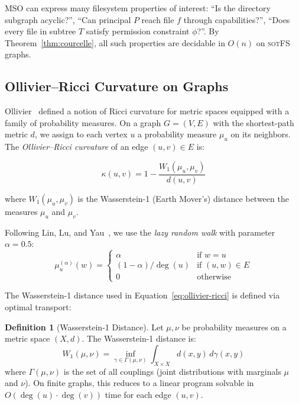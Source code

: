 \documentclass[11pt,a4paper]{article}
\theoremstyle{definition}
\newtheorem{definition}{Definition}[section]
\theoremstyle{remark}
\newcommand{\sotfs}{\textsc{sotFS}}
\newcommand{\OR}{\ensuremath{\kappa}}  %
\newcommand{\Wone}{\ensuremath{W_1}}
\begin{document}
MSO can express many filesystem properties of interest: ``Is the
directory subgraph acyclic?'', ``Can principal $P$ reach file $f$
through capabilities?'', ``Does every file in subtree $T$ satisfy
permission constraint $\phi$?''. By Theorem~\ref{thm:courcelle},
all such properties are decidable in $O(n)$ on \sotfs{} graphs.

\subsection{Ollivier--Ricci Curvature on Graphs}
\label{sec:bg-curvature}

Ollivier~\cite{ollivier2009} defined a notion of Ricci curvature for
metric spaces equipped with a family of probability measures. On a
graph $G = (V, E)$ with the shortest-path metric $d$, we assign to
each vertex $u$ a probability measure $\mu_u$ on its neighbors. The
\emph{Ollivier--Ricci curvature} of an edge $(u, v) \in E$ is:

\begin{equation}
\label{eq:ollivier-ricci}
\OR(u, v) = 1 - \frac{\Wone(\mu_u, \mu_v)}{d(u, v)}
\end{equation}

\noindent
where $\Wone(\mu_u, \mu_v)$ is the Wasserstein-1 (Earth Mover's)
distance between the measures $\mu_u$ and $\mu_v$.

Following Lin, Lu, and Yau~\cite{lin2011}, we use the \emph{lazy
random walk} with parameter $\alpha = 0.5$:
\[
\mu_u^{(\alpha)}(w) =
\begin{cases}
  \alpha & \text{if } w = u \\
  (1 - \alpha) / \deg(u) & \text{if } (u, w) \in E \\
  0 & \text{otherwise}
\end{cases}
\]

The Wasserstein-1 distance used in Equation~\eqref{eq:ollivier-ricci}
is defined via optimal transport:

\begin{definition}[Wasserstein-1 Distance]
\label{def:wasserstein}
Let $\mu, \nu$ be probability measures on a metric space $(X, d)$.
The Wasserstein-1 distance is:
\[
\Wone(\mu, \nu) = \inf_{\gamma \in \Gamma(\mu, \nu)}
  \int_{X \times X} d(x, y)\, d\gamma(x, y)
\]
where $\Gamma(\mu, \nu)$ is the set of all couplings (joint
distributions with marginals $\mu$ and $\nu$). On finite graphs,
this reduces to a linear program solvable in
$O(\deg(u) \cdot \deg(v))$ time for each edge $(u, v)$.
\end{definition}
\end{document}
